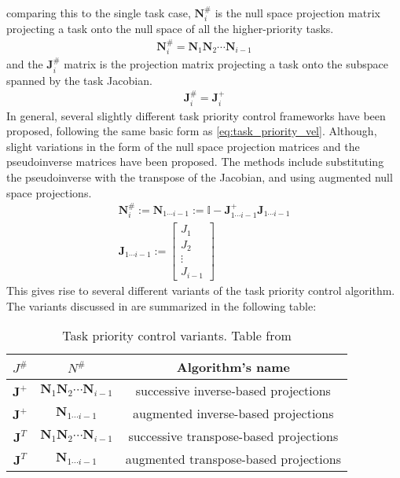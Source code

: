 comparing this to the single task case, $\bm{N}_i^{\#}$ is the null space projection matrix
projecting a task onto the null space of all the higher-priority tasks.
\begin{align}
    \bm{N}_i^{\#} = \bm{N}_1 \bm{N}_2 \cdots \bm{N}_{i-1}
\end{align}
and the $\bm{J}_i^{\#}$ matrix is the projection matrix projecting a task onto the
subspace spanned by the task Jacobian.
\begin{align}
    \bm{J}_i^{\#} = \bm{J}_i^+
\end{align}
In general, several slightly different task priority control frameworks have
been proposed, following the same basic form as \autoref{eq:task_priority_vel}.
Although, slight variations in the form of the null space projection matrices
and the pseudoinverse matrices have been proposed. The methods include substituting
the pseudoinverse with the transpose of the Jacobian, and using augmented null space
projections.
\begin{subequations}
    \label{eq:augmented_null_space}
\begin{align}
    \bm{N}_i^{\#} := \bm{N}_{1\cdots i-1} := \mathbb{I} - \bm{J}_{1\cdots i-1}^+ \bm{J}_{1\cdots i-1} \\
    \bm{J}_{1\cdots i-1} := \begin{bmatrix}
        J_1 \\
        J_2 \\
        \vdots \\
        J_{i-1}
    \end{bmatrix}
\end{align}
\end{subequations}
This gives rise to several different variants of the task priority control algorithm.
The variants discussed in \cite{antonelli2009} are summarized in the following table:
\begin{table}[h]
    \centering
    \begin{tabular}{|c|c|c|}
        \hline
        $J^{\#}$ & $N^{\#}$ & Algorithm's name \\
        \hline
        $\bm{J}^+$ & $\bm{N}_1 \bm{N}_2 \cdots \bm{N}_{i-1}$ & successive inverse-based projections \\
        $\bm{J}^+$ & $\bm{N}_{1\cdots i-1}$ & augmented inverse-based projections \\
        $\bm{J}^T$ & $\bm{N}_1 \bm{N}_2 \cdots \bm{N}_{i-1}$ & successive transpose-based projections \\
        $\bm{J}^T$ & $\bm{N}_{1\cdots i-1}$ & augmented transpose-based projections \\
        \hline
    \end{tabular}
    \label{tab:tpc_variants}
    \caption{Task priority control variants. Table from \cite{antonelli2009}}
\end{table}

